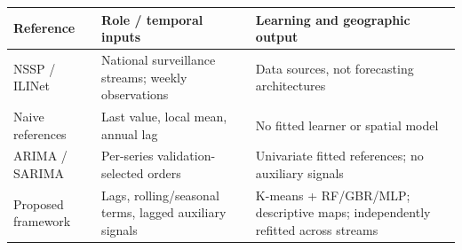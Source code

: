 \par\noindent\begin{minipage}{\columnwidth}
\label{tab:architecture}\centering\footnotesize
\begin{tabularx}{\columnwidth}{@{}p{}YY@{}}
\toprule
Reference & Role / temporal inputs & Learning and geographic output\\
\midrule
NSSP / ILINet & National surveillance streams; weekly observations & Data sources, not forecasting architectures\\
Naive references & Last value, local mean, annual lag & No fitted learner or spatial model\\
ARIMA / SARIMA & Per-series validation-selected orders & Univariate fitted references; no auxiliary signals\\
Proposed framework & Lags, rolling/seasonal terms, lagged auxiliary signals & K-means + RF/GBR/MLP; descriptive maps; independently refitted across streams\\
\bottomrule
\end{tabularx}
\end{minipage}
\par\smallskip
